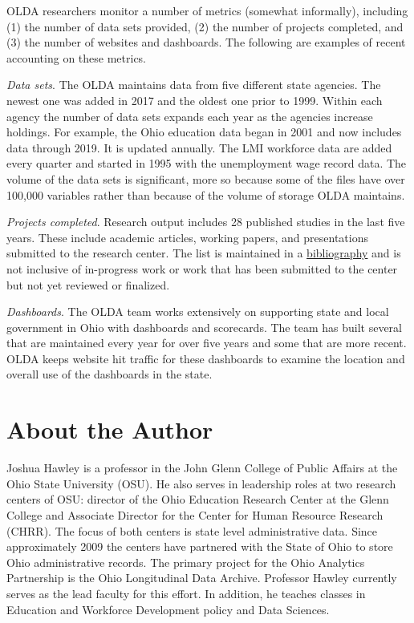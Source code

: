 \documentclass[
]{book}
\begin{document}
OLDA researchers monitor a number of metrics (somewhat informally), including (1) the number of data sets provided, (2) the number of projects completed, and (3) the number of websites and dashboards. The following are examples of recent accounting on these metrics.

\emph{Data sets}. The OLDA maintains data from five different state agencies. The newest one was added in 2017 and the oldest one prior to 1999. Within each agency the number of data sets expands each year as the agencies increase holdings. For example, the Ohio education data began in 2001 and now includes data through 2019. It is updated annually. The LMI workforce data are added every quarter and started in 1995 with the unemployment wage record data. The volume of the data sets is significant, more so because some of the files have over 100,000 variables rather than because of the volume of storage OLDA maintains.

\emph{Projects completed}. Research output includes 28 published studies in the last five years. These include academic articles, working papers, and presentations submitted to the research center. The list is maintained in a \href{https://www.chrr.ohio-state.edu/content/olda_bib/olda_bib.html}{bibliography} and is not inclusive of in-progress work or work that has been submitted to the center but not yet reviewed or finalized.

\emph{Dashboards}. The OLDA team works extensively on supporting state and local government in Ohio with dashboards and scorecards. The team has built several that are maintained every year for over five years and some that are more recent. OLDA keeps website hit traffic for these dashboards to examine the location and overall use of the dashboards in the state.

\hypertarget{about-the-author-2}{%
\section*{About the Author}\label{about-the-author-2}}

Joshua Hawley is a professor in the John Glenn College of Public Affairs at the Ohio State University (OSU). He also serves in leadership roles at two research centers of OSU: director of the Ohio Education Research Center at the Glenn College and Associate Director for the Center for Human Resource Research (CHRR). The focus of both centers is state level administrative data. Since approximately 2009 the centers have partnered with the State of Ohio to store Ohio administrative records. The primary project for the Ohio Analytics Partnership is the Ohio Longitudinal Data Archive. Professor Hawley currently serves as the lead faculty for this effort. In addition, he teaches classes in Education and Workforce Development policy and Data Sciences.
\end{document}
